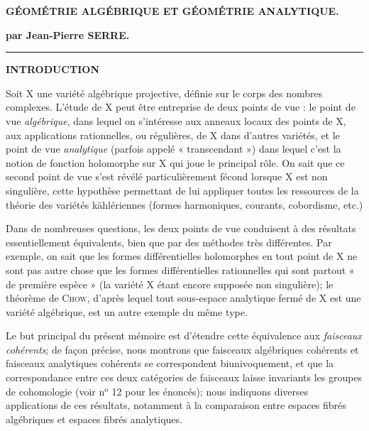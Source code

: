 


\begin{center}\bfseries GÉOMÉTRIE ALGÉBRIQUE ET GÉOMÉTRIE ANALYTIQUE.\end{center}

\begin{center}\bfseries par Jean-Pierre \MakeUppercase{Serre}.\end{center}

\begin{center}\rule{2.5cm}{0.4pt}\end{center}

\begin{center}\bfseries INTRODUCTION\end{center}

Soit $\mathrm{X}$ une variété algébrique projective, définie sur le corps des nombres complexes. L'étude de $\mathrm{X}$ peut être entreprise de deux points de vue : le point de vue \textit{algébrique}, dans lequel on s'intéresse aux anneaux locaux des points de $\mathrm{X}$, aux applications rationnelles, ou régulières, de $\mathrm{X}$ dans d'autres variétés, et le point de vue \textit{analytique} (parfois appelé « transcendant ») dans lequel c'est la notion de fonction holomorphe sur $\mathrm{X}$ qui joue le principal rôle. On sait que ce second point de vue s'est révélé particulièrement fécond lorsque $\mathrm{X}$ est non singulière, cette hypothèse permettant de lui appliquer toutes les ressources de la théorie des variétés kählériennes (formes harmoniques, courants, cobordisme, etc.)

Dans de nombreuses questions, les deux points de vue conduisent à des résultats essentiellement équivalents, bien que par des méthodes très différentes. Par exemple, on sait que les formes différentielles holomorphes en tout point de $\mathrm{X}$ ne sont pas autre chose que les formes différentielles rationnelles qui sont partout « de première espèce » (la variété $\mathrm{X}$ étant encore supposée non singulière); le théorème de \textsc{Chow}, d'après lequel tout sous-espace analytique fermé de $\mathrm{X}$ est une variété algébrique, est un autre exemple du même type.

Le but principal du présent mémoire est d'étendre cette équivalence aux \textit{faisceaux cohérents}; de façon précise, nous %
montrons que faisceaux algébriques cohérents et faisceaux analytiques cohérents se correspondent biunivoquement, et que la correspondance entre ces deux catégories de faisceaux laisse invariants les groupes de cohomologie (voir n$^{\mathrm{o}}$ 12 pour les énoncés); nous indiquons diverses applications de ces résultats, notamment à la comparaison entre espaces fibrés algébriques et espaces fibrés analytiques.

